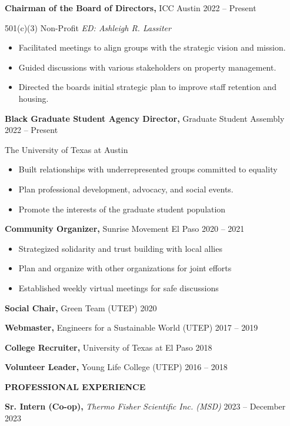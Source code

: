 \documentclass[11pt]{article}
\newcommand{\sectionheading}[1]{%
  \vspace{1.6ex}%
  {\large\bfseries\MakeUppercase{#1}}\par\vspace{0.6ex}%
}
\begin{document}
\textbf{Chairman of the Board of Directors,} ICC Austin 2022 -- Present

501(c)(3) Non-Profit \textbar{} \emph{ED: Ashleigh R. Lassiter}

\begin{itemize}
\item
  Facilitated meetings to align groups with the strategic vision and mission.
\item
  Guided discussions with various stakeholders on property management.
\item
  Directed the board\textquotesingle s initial strategic plan to improve staff retention and housing.
\end{itemize}

\textbf{Black Graduate Student Agency Director,} Graduate Student Assembly 2022 -- Present

The University of Texas at Austin

\begin{itemize}
\item
  Built relationships with underrepresented groups committed to equality
\item
  Plan professional development, advocacy, and social events.
\item
  Promote the interests of the graduate student population
\end{itemize}

\textbf{Community Organizer,} Sunrise Movement El Paso 2020 -- 2021

\begin{itemize}
\item
  Strategized solidarity and trust building with local allies
\item
  Plan and organize with other organizations for joint efforts
\item
  Established weekly virtual meetings for safe discussions
\end{itemize}

\textbf{Social Chair,} Green Team (UTEP) 2020

\textbf{Webmaster,} Engineers for a Sustainable World (UTEP) 2017 -- 2019

\textbf{College Recruiter,} University of Texas at El Paso 2018

\textbf{Volunteer Leader,} Young Life College (UTEP) 2016 -- 2018

\sectionheading{PROFESSIONAL EXPERIENCE}

\textbf{Sr. Intern (Co-op),} \emph{Thermo Fisher Scientific Inc. (MSD)} 2023 -- December 2023
\end{document}
